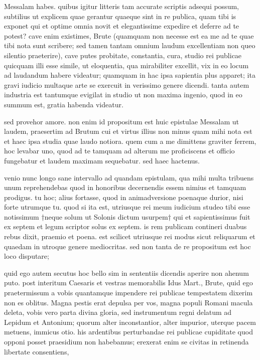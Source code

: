 


 Messalam habes. quibus igitur litteris tam accurate scriptis adsequi possum, subtilius ut explicem quae gerantur quaeque sint in re publica, quam tibi is exponet qui et optime omnia novit et elegantissime expedire et deferre ad te potest? cave enim existimes, Brute (quamquam non necesse est ea me ad te quae tibi nota sunt scribere; sed tamen tantam omnium laudum excellentiam non queo silentio praeterire), cave putes probitate, constantia, cura, studio rei publicae quicquam illi esse simile, ut eloquentia, qua mirabiliter excellit, vix in eo locum ad laudandum habere videatur; quamquam in hac ipsa sapientia plus apparet; ita gravi iudicio multaque arte se exercuit in verissimo genere dicendi. tanta autem industria est tantumque evigilat in studio ut non maxima ingenio, quod in eo summum est, gratia habenda videatur.

 sed provehor amore. non enim id propositum est huic epistulae Messalam ut laudem, praesertim ad Brutum cui et virtus illius non minus quam mihi nota est et haec ipsa studia quae laudo notiora. quem cum a me dimittens graviter ferrem, hoc levabar uno, quod ad te tamquam ad alterum me proficiscens et officio fungebatur et laudem maximam sequebatur. sed haec hactenus.

 venio nunc longo sane intervallo ad quandam epistulam, qua mihi multa tribuens unum reprehendebas quod in honoribus decernendis essem nimius et tamquam prodigus. tu hoc; alius fortasse, quod in animadversione poenaque durior, nisi forte utrumque tu. quod si ita est, utriusque rei meum iudicium studeo tibi esse notissimum †neque solum ut Solonis dictum usurpem† qui et sapientissimus fuit ex septem et legum scriptor solus ex septem. is rem publicam contineri duabus rebus dixit, praemio et poena. est scilicet utriusque rei modus sicut reliquarum et quaedam in utroque genere mediocritas. sed non tanta de re propositum est hoc loco disputare;

 quid ego autem secutus hoc bello sim in sententiis dicendis aperire non ahenum puto. post interitum Caesaris et vestras memorabilis Idus Mart., Brute, quid ego praetermissum a vobis quantamque impendere rei publicae tempestatem dixerim non es oblitus. Magna pestis erat depulsa per vos, magna populi Romani macula deleta, vobis vero parta divina gloria, sed instrumentum regni delatum ad Lepidum et Antonium; quorum alter inconstantior, alter impurior, uterque pacem metuens, immicus otio. his ardentibus perturbandae rei publicae cupiditate quod opponi posset praesidium non habebamus; erexerat enim se civitas in retinenda libertate consentiens,

